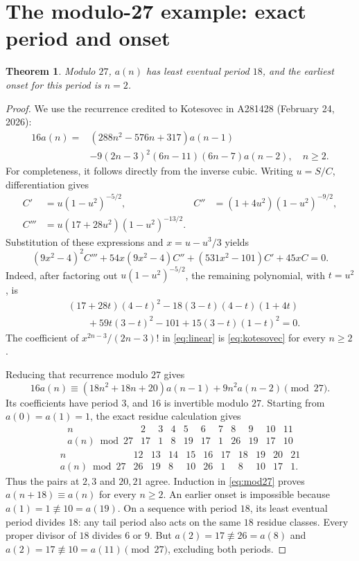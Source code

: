 \documentclass[11pt]{article}
\newtheorem{theorem}{Theorem}
\begin{document}
\section{The modulo-27 example: exact period and onset}\label{sec:27}
\begin{theorem}\label{thm:27}
Modulo $27$, $a(n)$ has least eventual period $18$, and the earliest
onset for this period is $n=2$.
\end{theorem}
\begin{proof}
We use the recurrence credited to Kotesovec in A281428 (February 24, 2026):
\begin{equation}\label{eq:kotesovec}
\begin{split}
16a(n)={}&(288n^2-576n+317)a(n-1)\\
&-9(2n-3)^2(6n-11)(6n-7)a(n-2),\quad n\geq2.
\end{split}
\end{equation}
For completeness, it follows directly from the inverse cubic.
Writing $u=S/C$, differentiation gives
\begin{align*}
C'&=u(1-u^2)^{-5/2},&
C''&=(1+4u^2)(1-u^2)^{-9/2},\\
C'''&=u(17+28u^2)(1-u^2)^{-13/2}.
\end{align*}
Substitution of these expressions and $x=u-u^3/3$ yields
\begin{equation}\label{eq:linear}
(9x^2-4)^2C'''+54x(9x^2-4)C''+(531x^2-101)C'+45xC=0.
\end{equation}
Indeed, after factoring out $u(1-u^2)^{-5/2}$, the remaining
polynomial, with $t=u^2$, is
\begin{align*}
&(17+28t)(4-t)^2-18(3-t)(4-t)(1+4t)\\
&\hspace{2em}+59t(3-t)^2-101+15(3-t)(1-t)^2=0.
\end{align*}
The coefficient of $x^{2n-3}/(2n-3)!$ in \eqref{eq:linear} is
\eqref{eq:kotesovec} for every $n\geq2$.

Reducing that recurrence modulo $27$ gives
\begin{equation}\label{eq:mod27}
16a(n)\equiv(18n^2+18n+20)a(n-1)+9n^2a(n-2)\pmod{27}.
\end{equation}
Its coefficients have period $3$, and $16$ is invertible modulo $27$.
Starting from $a(0)=a(1)=1$, the exact residue calculation gives
\[
\begin{array}{c|rrrrrrrrrr}
n&2&3&4&5&6&7&8&9&10&11\\ \hline
a(n)\bmod27&17&1&8&19&17&1&26&19&17&10
\end{array}
\]
\[
\begin{array}{c|rrrrrrrrrr}
n&12&13&14&15&16&17&18&19&20&21\\ \hline
a(n)\bmod27&26&19&8&10&26&1&8&10&17&1.
\end{array}
\]
Thus the pairs at $2,3$ and $20,21$ agree. Induction in
\eqref{eq:mod27} proves $a(n+18)\equiv a(n)$ for every $n\geq2$.
An earlier onset is impossible because $a(1)=1\not\equiv10=a(19)$.
On a sequence with period $18$, its least eventual period divides $18$:
any tail period also acts on the same $18$ residue classes.
Every proper divisor of $18$ divides $6$ or $9$.
But $a(2)=17\not\equiv26=a(8)$ and
$a(2)=17\not\equiv10=a(11)\pmod{27}$, excluding both periods.
\end{proof}
\end{document}
